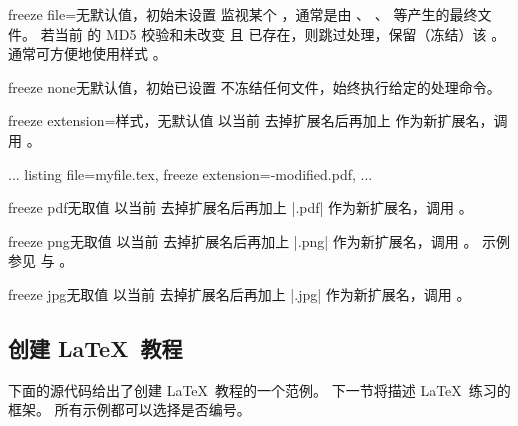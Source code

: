 \begin{docTcbKey}[][doc new=2016-07-14]{freeze file}{=}{无默认值，初始未设置}
  监视某个 ，通常是由 、
  、 等产生的最终文件。
  若当前  的 MD5 校验和未改变
  且  已存在，则跳过处理，保留（冻结）该 。
  通常可方便地使用样式 。
\end{docTcbKey}

\begin{docTcbKey}[][doc new=2016-07-14]{freeze none}{}{无默认值，初始已设置}
  不冻结任何文件，始终执行给定的处理命令。
\end{docTcbKey}

\begin{docTcbKey}[][doc new=2016-07-14]{freeze extension}{=}{样式，无默认值}
  以当前  去掉扩展名后再加上 
  作为新扩展名，调用 。
\begin{dispListing}
  ...
  listing file=myfile.tex,
  freeze extension=-modified.pdf,    %
  ...
\end{dispListing}
\end{docTcbKey}

\begin{docTcbKey}[][doc new=2016-07-14]{freeze pdf}{}{无取值}
  以当前  去掉扩展名后再加上 |.pdf|
  作为新扩展名，调用 。
\end{docTcbKey}

\begin{docTcbKey}[][doc new=2016-07-14]{freeze png}{}{无取值}
  以当前  去掉扩展名后再加上 |.png|
  作为新扩展名，调用 。
  示例参见  与 。
\end{docTcbKey}

\begin{docTcbKey}[][doc new=2016-07-14]{freeze jpg}{}{无取值}
  以当前  去掉扩展名后再加上 |.jpg|
  作为新扩展名，调用 。
\end{docTcbKey}




\clearpage
\subsection{创建 \LaTeX\ 教程}\label{sec:latextutorial}
下面的源代码给出了创建 \LaTeX\ 教程的一个范例。
下一节将描述 \LaTeX\ 练习的框架。
所有示例都可以选择是否编号。


